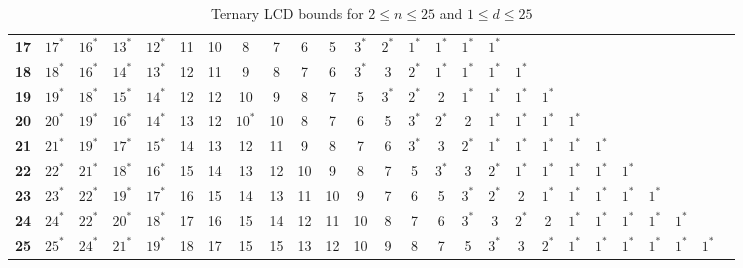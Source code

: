 \begin{sidewaystable}
\begin{tabular}{|c| c c c c c c c c c c c c c c c c c c c c c c c c c |}
\textbf{17} & $17^*$ & $16^*$ & $13^*$ & $12^*$ & 11 & 10 & 8 & 7 & 6 & 5 & $3^*$ & $2^*$ & $1^*$ & $1^*$ & $1^*$ & $1^*$ & & & & & & & & & \\
\textbf{18} & $18^*$ & $16^*$ & $14^*$ & $13^*$ & 12 & 11 & 9 & 8 & 7 & 6 & $3^*$ & 3 & $2^*$ & $1^*$ & $1^*$ & $1^*$ & $1^*$ & & & & & & & & \\
\textbf{19} & $19^*$ & $18^*$ & $15^*$ & $14^*$ & 12 & 12 & 10 & 9 & 8 & 7 & 5 & $3^*$ & $2^*$ & 2 & $1^*$ & $1^*$ & $1^*$ & $1^*$ & & & & & & & \\
\textbf{20} & $20^*$ & $19^*$ & $16^*$ & $14^*$ & 13 & 12 & $10^*$ & 10 & 8 & 7 & 6 & 5 & $3^*$ & $2^*$ & 2 & $1^*$ & $1^*$ & $1^*$ & $1^*$ & & & & & & \\
\textbf{21} & $21^*$ & $19^*$ & $17^*$ & $15^*$ & 14 & 13 & 12 & 11 & 9 & 8 & 7 & 6 & $3^*$ & 3 & $2^*$ & $1^*$ & $1^*$ & $1^*$ & $1^*$ & $1^*$ & & & & & \\
\textbf{22} & $22^*$ & $21^*$ & $18^*$ & $16^*$ & 15 & 14 & 13 & 12 & 10 & 9 & 8 & 7 & 5 & $3^*$ & 3 & $2^*$ & $1^*$ & $1^*$ & $1^*$ & $1^*$ & $1^*$ & & & & \\
\textbf{23} & $23^*$ & $22^*$ & $19^*$ & $17^*$ & 16 & 15 & 14 & 13 & 11 & 10 & 9 & 7 & 6 & 5 & $3^*$ & $2^*$ & 2 & $1^*$ & $1^*$ & $1^*$ & $1^*$ & $1^*$ & & & \\
\textbf{24} & $24^*$ & $22^*$ & $20^*$ & $18^*$ & 17 & 16 & 15 & 14 & 12 & 11 & 10 & 8 & 7 & 6 & $3^*$ & 3 & $2^*$ & 2 & $1^*$ & $1^*$ & $1^*$ & $1^*$ & $1^*$ & & \\
\textbf{25} & $25^*$ & $24^*$ & $21^*$ & $19^*$ & 18 & 17 & 15 & 15 & 13 & 12 & 10 & 9 & 8 & 7 & 5 & $3^*$ & 3 & $2^*$ & $1^*$ & $1^*$ & $1^*$ & $1^*$ & $1^*$ & $1^*$ & \\
\hline
\end{tabular}
\caption{Ternary LCD bounds for $2 \leq n \leq 25$ and $1 \leq d \leq 25$}
\label{tab:lp_tables_q3_2_25_1_25}
\end{sidewaystable}